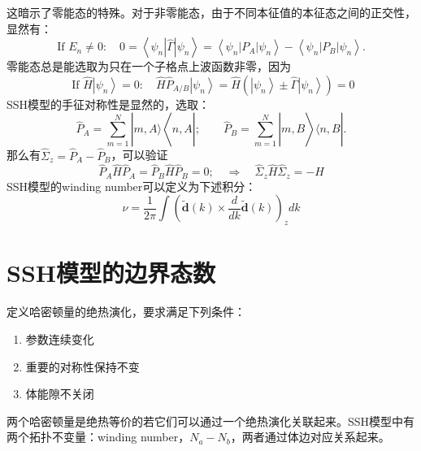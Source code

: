 \documentclass[12pt, a4paper, oneside]{ctexbook}
\begin{document}
这暗示了零能态的特殊。对于非零能态，由于不同本征值的本征态之间的正交性，显然有：
\begin{equation}
	\text { If } E_n \neq 0: \quad 0=\left\langle\psi_n|\hat{\Gamma}| \psi_n\right\rangle=\left\langle\psi_n\left|P_A\right| \psi_n\right\rangle-\left\langle\psi_n\left|P_B\right| \psi_n\right\rangle \text {. }
\end{equation}
零能态总是能选取为只在一个子格点上波函数非零，因为
\begin{equation}
	\text { If } \hat{H}\left|\psi_n\right\rangle=0: \quad \hat{H} \hat{P}_{A / B}\left|\psi_n\right\rangle=\hat{H}\left(\left|\psi_n\right\rangle \pm \hat{\Gamma}\left|\psi_n\right\rangle\right)=0
\end{equation}
SSH模型的手征对称性是显然的，选取：
\begin{equation}
	\hat{P}_A=\sum_{m=1}^N|m, A\rangle\left\langle n, A\left|; \quad \quad \hat{P}_B=\sum_{m=1}^N\right| m, B\right\rangle\langle n, B| .
\end{equation}
那么有$ \hat{\Sigma}_z=\hat{P}_A-\hat{P}_B $，可以验证
\begin{equation}
	\hat{P}_A \hat{H} \hat{P}_A=\hat{P}_B \hat{H} \hat{P}_B=0 ; \quad \Longrightarrow \quad \hat{\Sigma}_z \hat{H} \hat{\Sigma}_z=-\hat{H}
\end{equation} 
SSH模型的winding number可以定义为下述积分：
\begin{equation}
	\nu=\frac{1}{2 \pi} \int\left(\tilde{\mathbf{d}}(k) \times \frac{d}{d k} \tilde{\mathbf{d}}(k)\right)_z d k
\end{equation}
\section{SSH模型的边界态数}
定义哈密顿量的绝热演化，要求满足下列条件：
\begin{enumerate}
	\item 参数连续变化
	\item 重要的对称性保持不变
	\item 体能隙不关闭
\end{enumerate}
两个哈密顿量是绝热等价的若它们可以通过一个绝热演化关联起来。SSH模型中有两个拓扑不变量：winding number，$ N_a-N_b $，两者通过体边对应关系起来。
\end{document}

